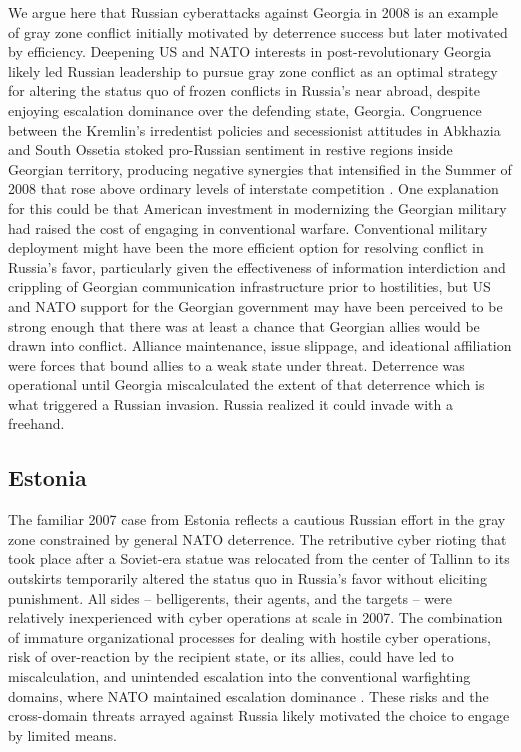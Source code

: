 \documentclass[12pt,letterpaper]{article}
\begin{document}
		We argue here that Russian cyberattacks against Georgia in 2008 is an example of gray zone conflict initially motivated by deterrence success but later motivated by efficiency. Deepening US and NATO interests in post-revolutionary Georgia likely led Russian leadership to pursue gray zone conflict as an optimal strategy for altering the status quo of frozen conflicts in Russia’s near abroad, despite enjoying escalation dominance over the defending state, Georgia. Congruence between the Kremlin’s irredentist policies  and secessionist attitudes in Abkhazia and South Ossetia stoked pro-Russian sentiment in restive regions inside Georgian territory, producing negative synergies that intensified in the Summer of 2008 that rose above ordinary levels of interstate competition \citep{medvedevvowsprotect_2008, deibert_cyclonescyberspaceinformation_2012}. One explanation for this could be that American investment in modernizing the Georgian military had raised the cost of engaging in conventional warfare. Conventional military deployment might have been the more efficient option for resolving conflict in Russia’s favor, particularly given the effectiveness of information interdiction and crippling of Georgian communication infrastructure prior to hostilities, but US and NATO support for the Georgian government may have been perceived to be strong enough that there was at least a chance that Georgian allies would be drawn into conflict. Alliance maintenance, issue slippage, and ideational affiliation were forces that bound allies to a weak state under threat. Deterrence was operational until Georgia miscalculated the extent of that deterrence which is what triggered a Russian invasion. Russia realized it could invade with a freehand.

	\subsection{Estonia}
		The familiar 2007 case from Estonia reflects a cautious Russian effort in the gray zone constrained by general NATO deterrence. The retributive cyber rioting that took place after a Soviet-era statue was relocated from the center of Tallinn to its outskirts temporarily altered the status quo in Russia’s favor without eliciting punishment. All sides – belligerents, their agents, and the targets – were relatively inexperienced with cyber operations at scale in 2007. The combination of immature organizational processes for dealing with hostile cyber operations, risk of over-reaction by the recipient state, or its allies, could have led to miscalculation, and unintended escalation into the conventional warfighting domains, where NATO maintained escalation dominance \citep{slayton_whatcyberoffensedefense_2017}. These risks and the cross-domain threats arrayed against Russia likely motivated the choice to engage by limited means.
		
\end{document}
